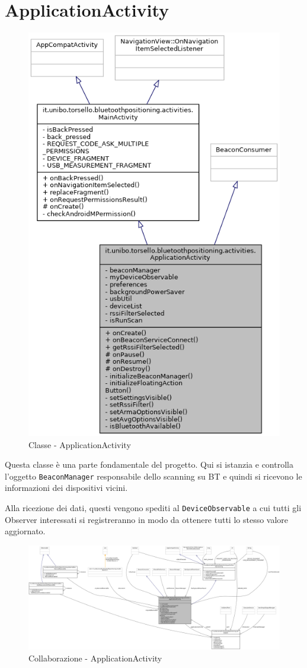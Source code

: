 \newpage
\section{ApplicationActivity}
\begin{figure}[ph]
	\centering
	\includegraphics[width=0.7\linewidth]{img/uml/class/classit_1_1unibo_1_1torsello_1_1bluetoothpositioning_1_1activities_1_1ApplicationActivity__inherit__graph.png}
	\caption{Classe - ApplicationActivity}
\end{figure}

Questa classe è una parte fondamentale del progetto. Qui si istanzia e controlla l'oggetto \texttt{BeaconManager} responsabile dello scanning su BT e quindi si ricevono le informazioni dei dispositivi vicini.

Alla ricezione dei dati, questi vengono spediti al \texttt{DeviceObservable} a cui tutti gli Observer interessati si registreranno in modo da ottenere tutti lo stesso valore aggiornato.

\begin{figure}[ph]
	\centering
	\includegraphics[width=1.55\linewidth, angle=90]{img/uml/class/classit_1_1unibo_1_1torsello_1_1bluetoothpositioning_1_1activities_1_1ApplicationActivity__coll__graph.png}
	\caption{Collaborazione - ApplicationActivity}
\end{figure}

